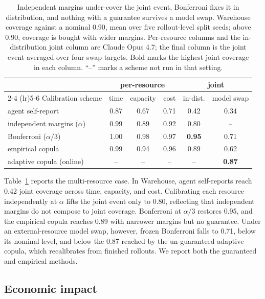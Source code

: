 \documentclass{article}
\begin{document}
\begin{table}[!htb]
  \caption{Independent margins under-cover the joint event, Bonferroni fixes it in
  distribution, and nothing with a guarantee survives a model swap. Warehouse coverage
  against a nominal 0.90, mean over five rollout-level split seeds; above 0.90,
  coverage is bought with wider margins. Per-resource columns and the in-distribution
  joint column are Claude Opus 4.7; the final column is the joint event averaged over
  four swap targets. Bold marks the highest joint coverage in each column. ``--'' marks
  a scheme not run in that setting.}
  \label{tab:multires}
  \centering
  \small
  \begin{tabular}{lccccc}
    \toprule
    & \multicolumn{3}{c}{per-resource} & \multicolumn{2}{c}{joint} \\
    \cmidrule(lr){2-4} \cmidrule(lr){5-6}
    Calibration scheme & time & capacity & cost & in-dist. & model swap \\
    \midrule
    agent self-report & 0.87 & 0.67 & 0.71 & 0.42 & 0.34 \\
    independent margins ($\alpha$) & 0.99 & 0.89 & 0.92 & 0.80 & -- \\
    Bonferroni ($\alpha/3$) & 1.00 & 0.98 & 0.97 & \textbf{0.95} & 0.71 \\
    empirical copula & 0.99 & 0.94 & 0.96 & 0.89 & 0.62 \\
    adaptive copula (online) & -- & -- & -- & -- & \textbf{0.87} \\
    \bottomrule
  \end{tabular}
\end{table}

Table~\ref{tab:multires} reports the multi-resource case. In Warehouse, agent
self-reports reach 0.42 joint coverage across time, capacity, and cost. Calibrating
each resource independently at $\alpha$ lifts the joint event only to 0.80, reflecting
that independent margins do not compose to joint coverage. Bonferroni at $\alpha/3$
restores 0.95, and the empirical copula reaches 0.89 with narrower margins but no
guarantee. Under an external-resource model swap, however, frozen Bonferroni falls to
0.71, below its nominal level, and below the 0.87 reached by the un-guaranteed adaptive
copula, which recalibrates from finished rollouts. We report both the guaranteed and
empirical methods.

\subsection{Economic impact}
\label{sec:econ}
\end{document}
